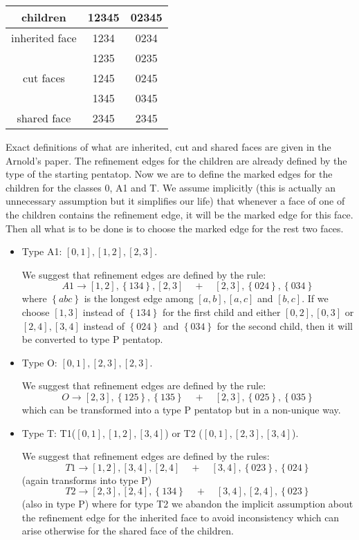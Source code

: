 \documentclass[a4paper,12pt]{amsart}
\numberwithin{equation}{section}
\begin{document}
\begin{center}
\begin{tabular}[!h]{|c|c|c|}
\hline
 children & 12345 & 02345 \\ \hline
 inherited face & 1234  & 0234  \\ \hline 
 \multirow{3}{*}{cut faces} & 1235 & 0235 \\
 & 1245 & 0245 \\
 & 1345 & 0345 \\ \hline
 shared face & 2345 & 2345 \\ \hline
\end{tabular}
\end{center}
Exact definitions of what are inherited, cut and shared faces are given in the Arnold's paper.
The refinement edges for the children are already defined by the type of the starting pentatop. Now we are to define the marked edges for the children for the classes 0, A1 and T. We assume implicitly (this is actually an unnecessary assumption but it simplifies our life) that whenever a face of one of the children contains the refinement edge, it will be the marked edge for this face. Then all what is to be done is to choose the marked edge for the rest two faces.

\begin{itemize}
	\item Type A1: $[0,1], [1,2], [2,3]$.

    We suggest that refinement edges are defined by the rule:
    $$
    A1 \rightarrow [1,2], \left\{134\right\}, [2,3] \quad + \quad [2,3], \left\{024\right\}, \left\{034\right\}
    $$
    where $\left\{abc\right\}$ is the longest edge among $[a,b],[a,c]$ and $[b,c]$.
    If we choose $[1,3]$ instead of $\left\{134 \right\}$ for the first child and either $[0,2],[0,3]$ or $[2,4],[3,4]$ instead of $\left\{024 \right\}$ and $\left\{034 \right\}$ for the second child, then it will be converted to type P pentatop.
	
	
	\item Type O: $[0,1], [2,3], [2,3]$.
	
	We suggest that refinement edges are defined by the rule:
    $$
    O \rightarrow [2,3], \left\{125\right\}, \left\{135\right\} \quad + \quad [2,3], \left\{025\right\}, \left\{035\right\}
    $$
    which can be transformed into a type P pentatop but in a non-unique way.
	\item Type T: T1($[0,1], [1,2], [3,4]$) or T2 ($[0,1], [2,3], [3,4]$).
	
	We suggest that refinement edges are defined by the rules:
    $$
    T1 \rightarrow [1,2], [3,4], [2,4] \quad + \quad [3,4], \left\{023\right\}, \left\{024\right\}
    $$	
    (again transforms into type P)
    $$
    T2 \rightarrow [2,3], [2,4], \left\{134\right\} \quad + \quad [3,4], [2,4], \left\{023\right\}
    $$	
    (also in type P)
    where for type T2 we abandon the implicit assumption about the refinement edge for the inherited face to avoid inconsistency which can arise otherwise for the shared face of the children.
\end{itemize}
\end{document}
